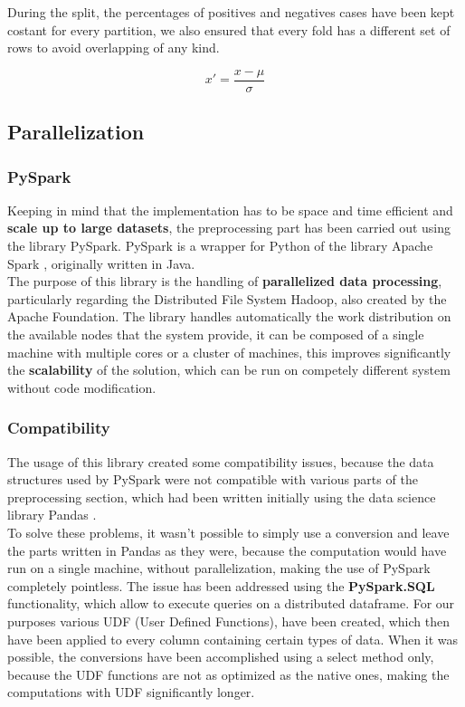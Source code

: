 \documentclass[
	letterpaper, %
	10pt, %
]{class}
\begin{document}
During the split, the percentages of positives and negatives cases have been kept costant for every partition, we also ensured that every fold has a different set of rows to avoid overlapping of any kind.

$$ x' = \frac{x - \mu}{\sigma} $$

\subsection{Parallelization}

\subsubsection{PySpark}
Keeping in mind that the implementation has to be space and time efficient and \textbf{scale up to large datasets}, the preprocessing part has been carried out using the library PySpark.
PySpark is a wrapper for Python of the library Apache Spark \cite{spark}, originally written in Java.\\

The purpose of this library is the handling of \textbf{parallelized data processing}, particularly regarding the Distributed File System Hadoop, also created by the Apache Foundation.
The library handles automatically the work distribution on the available nodes that the system provide, it can be composed of a single machine with multiple cores or a cluster of machines, this improves significantly the \textbf{scalability} of the solution, which can be run on competely different system without code modification.\\

\subsubsection{Compatibility}

The usage of this library created some compatibility issues, because the data structures used by PySpark were not compatible with various parts of the preprocessing section, which had been written initially using the data science library Pandas \cite{pandas}.\\

To solve these problems, it wasn't possible to simply use a conversion and leave the parts written in Pandas as they were, because the computation would have run on a single machine, without parallelization, making the use of PySpark completely pointless.
The issue has been addressed using the \textbf{PySpark.SQL} functionality, which allow to execute queries on a distributed dataframe. For our purposes various UDF (User Defined Functions), have been created, which then have been applied to every column containing certain types of data.
When it was possible, the conversions have been accomplished using a select method only, because the UDF functions are not as optimized as the native ones, making the computations with UDF significantly longer.\\
\end{document}
